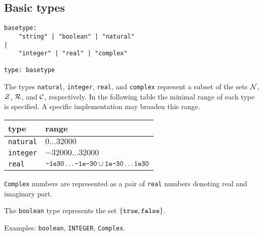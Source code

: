 \documentclass[a4paper]{article}
\begin{document}
\subsection{Basic types}
\label{s.types}
\begin{verbatim}
basetype:
    "string" | "boolean" | "natural"
|
    "integer" | "real" | "complex"

type: basetype
\end{verbatim}
The types {\tt natural}, {\tt integer}, {\tt real}, and {\tt complex}
represent a subset of the sets $\cal N$, $\cal Z$, $\cal R$,
and $\cal C$, respectively. In the following table the minimal range
of each type is specified. A specific implementation may broaden this
range.
\begin{center}
\begin{tabular}{ll}
type & range \\
\hline
{\tt natural} & $0 \ldots 32000$ \\
{\tt integer} & $-32000 \ldots 32000$ \\
{\tt real} & $\verb"-1e30" \ldots \verb"-1e-30" \cup \verb"1e-30" \ldots \verb"1e30"$ \\
\end{tabular}
\end{center}
{\tt Complex} numbers are represented as a pair of {\tt real} numbers
denoting real and imaginary part.
\par
The {\tt boolean} type represents the set $\{ \verb"true", \verb"false" \}$.
\par
Examples: \verb"boolean", \verb"INTEGER", \verb"Complex".
\end{document}
